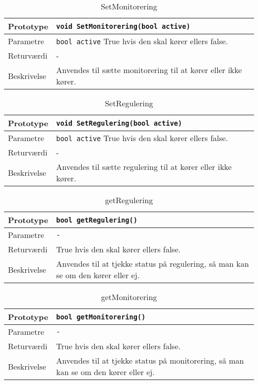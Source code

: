 \begin{table}[ht]
\begin{tabularx}{\textwidth}{| L{2.5 cm} | Z |} \hline
Prototype & \texttt{void SetMonitorering(bool active)} \\\hline
Parametre & \texttt{bool active} \newline
True hvis den skal kører ellers false. \\\hline
Returværdi & - \\\hline
Beskrivelse & Anvendes til sætte monitorering til at kører eller ikke kører. \\\hline
\end{tabularx}
\caption{SetMonitorering}
\label{table:Indstillinger_SetMonitorering}
\end{table}

\begin{table}[ht]
\begin{tabularx}{\textwidth}{| L{2.5 cm} | Z |} \hline
Prototype & \texttt{void SetRegulering(bool active)} \\\hline
Parametre & \texttt{bool active} \newline
True hvis den skal kører ellers false. \\\hline
Returværdi & - \\\hline
Beskrivelse & Anvendes til sætte regulering til at kører eller ikke kører. \\\hline
\end{tabularx}
\caption{SetRegulering}
\label{table:Indstillinger_SetRegulering}
\end{table}

\begin{table}[ht]
\begin{tabularx}{\textwidth}{| L{2.5 cm} | Z |} \hline
Prototype & \texttt{bool getRegulering()} \\\hline
Parametre & \texttt{-} \newline
 \\\hline
Returværdi & True hvis den skal kører ellers false. \\\hline
Beskrivelse & Anvendes til at tjekke status på regulering, så man kan se om den kører eller ej. \\\hline
\end{tabularx}
\caption{getRegulering}
\label{table:Indstillinger_getRegulering}
\end{table}

\begin{table}[ht]
\begin{tabularx}{\textwidth}{| L{2.5 cm} | Z |} \hline
Prototype & \texttt{bool getMonitorering()} \\\hline
Parametre & \texttt{-} \newline
 \\\hline
Returværdi & True hvis den skal kører ellers false. \\\hline
Beskrivelse & Anvendes til at tjekke status på monitorering, så man kan se om den kører eller ej. \\\hline
\end{tabularx}
\caption{getMonitorering}
\label{table:Indstillinger_getMonitorering}
\end{table}

